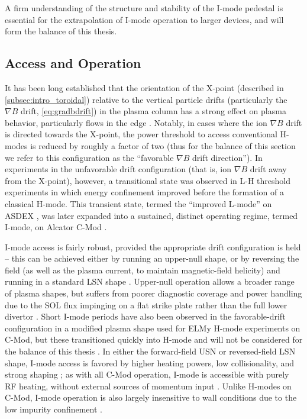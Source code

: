 \noindent A firm understanding of the structure and stability of the I-mode pedestal is essential for the extrapolation of I-mode operation to larger devices, and will form the balance of this thesis.

\subsection{Access and Operation}\label{subsec:hcr_imode_access}

It has been long established that the orientation of the X-point (described in \cref{subsec:intro_toroidal}) relative to the vertical particle drifts (particularly the $\nabla B$ drift, \cref{eq:gradbdrift}) in the plasma column has a strong effect on plasma behavior, particularly flows in the edge \cite{LaBombard2004,Fenzi2005,Hubbard2007,LaBombard2008}.  Notably, in cases where the ion $\nabla B$ drift is directed towards the X-point, the power threshold to access conventional H-modes is reduced by roughly a factor of two \cite{Carlstrom1998,Groebner1998,Suttrop2003} (thus for the balance of this section we refer to this configuration as the ``favorable $\nabla B$ drift direction'').  In experiments in the unfavorable drift configuration (that is, ion $\nabla B$ drift away from the X-point), however, a transitional state was observed in L-H threshold experiments in which energy confinement improved before the formation of a classical H-mode.  This transient state, termed the ``improved L-mode'' on ASDEX \cite{Ryter1998}, was later expanded into a sustained, distinct operating regime, termed I-mode, on Alcator C-Mod \cite{Whyte2010,McDermott2009a,Hubbard2011}.

I-mode access is fairly robust, provided the appropriate drift configuration is held -- this can be achieved either by running an upper-null shape, or by reversing the field (as well as the plasma current, to maintain magnetic-field helicity) and running in a standard LSN shape \cite{Hubbard2012}.  Upper-null operation allows a broader range of plasma shapes, but suffers from poorer diagnostic coverage and power handling due to the SOL flux impinging on a flat strike plate rather than the full lower divertor \cite{Hubbard2012,Dominguez2012}.  Short I-mode periods have also been observed in the favorable-drift configuration in a modified plasma shape used for ELMy H-mode experiments on C-Mod, but these transitioned quickly into H-mode and will not be considered for the balance of this thesis \cite{Dominguez2012,Hughes2013}.  In either the forward-field USN or reversed-field LSN shape, I-mode access is favored by higher heating powers, low collisionality, and strong shaping \cite{Whyte2010}; as with all C-Mod operation, I-mode is accessible with purely RF heating, without external sources of momentum input \cite{Hubbard2012b}.  Unlike H-modes on C-Mod, I-mode operation is also largely insensitive to wall conditions due to the low impurity confinement \cite{Hubbard2012}.

